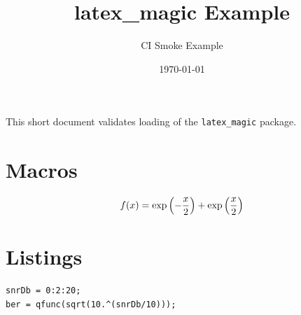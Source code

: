 \documentclass[11pt,a4paper]{article}
\title{latex\_magic Example}
\author{CI Smoke Example}
\date{\today}
\begin{document}
\maketitle

This short document validates loading of the \texttt{latex\_magic} package.

\section*{Macros}
\[
f(x) = \exp\left(-\frac{x}{2}\right) + \exp\left(\frac{x}{2}\right)
\]

\section*{Listings}
\begin{lstlisting}[style=MatlabStyle]
snrDb = 0:2:20;
ber = qfunc(sqrt(10.^(snrDb/10)));
\end{lstlisting}
\end{document}

